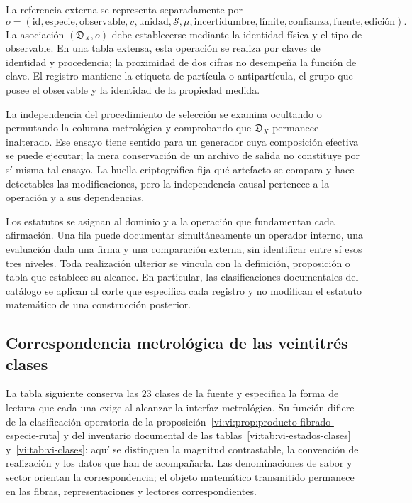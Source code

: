 La referencia externa se representa separadamente por
\[
 o=(\mathrm{id},\mathrm{especie},\mathrm{observable},
      v,\mathrm{unidad},\mathscr S,\mu,
      \mathrm{incertidumbre},\text{límite},\mathrm{confianza},
      \mathrm{fuente},\text{edición}).
\]
La asociación \((\mathfrak D_X,o)\) debe establecerse mediante la
identidad física y el tipo de observable. En una tabla extensa, esta
operación se realiza por claves de identidad y procedencia; la proximidad
de dos cifras no desempeña la función de clave. El registro mantiene la
etiqueta de partícula o antipartícula, el grupo que posee el observable y
la identidad de la propiedad medida.

La independencia del procedimiento de selección se examina ocultando o
permutando la columna metrológica y comprobando que \(\mathfrak D_X\)
permanece inalterado. Ese ensayo tiene sentido para un generador cuya
composición efectiva se puede ejecutar; la mera conservación de un archivo
de salida no constituye por sí misma tal ensayo. La huella criptográfica
fija qué artefacto se compara y hace detectables las modificaciones, pero
la independencia causal pertenece a la operación y a sus dependencias.

Los estatutos se asignan al dominio y a la operación que fundamentan cada
afirmación. Una fila puede documentar simultáneamente un operador interno,
una evaluación dada una firma y una comparación externa, sin identificar
entre sí esos tres niveles. Toda realización ulterior se vincula con la
definición, proposición o tabla que establece su alcance. En particular, las
clasificaciones documentales del catálogo se aplican al corte que especifica
cada registro y no modifican el estatuto matemático de una construcción
posterior.

\subsection{Correspondencia metrológica de las veintitrés clases}
\label{vi:subsec:vi-clases-metrologia}

La tabla siguiente conserva las \(23\) clases de la fuente y especifica la
forma de lectura que cada una exige al alcanzar la interfaz metrológica. Su
función difiere de la clasificación operatoria de la
proposición~\ref{vi:vi:prop:producto-fibrado-especie-ruta} y del inventario
documental de las tablas~\ref{vi:tab:vi-estados-clases} y~\ref{vi:tab:vi-clases}:
aquí se distinguen la magnitud contrastable, la convención de realización y
los datos que han de acompañarla. Las denominaciones de sabor y sector
orientan la correspondencia; el objeto matemático transmitido permanece en
las fibras, representaciones y lectores correspondientes.

